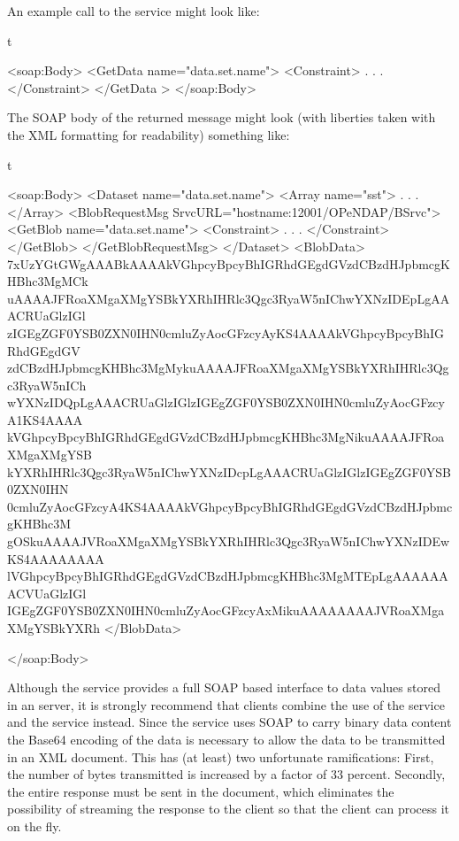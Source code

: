 \documentclass[justify]{dods-paper}
\begin{document}
An example call to the \GetData service might look like:

\begin{vcode}{t}

    <soap:Body>
        <GetData name="data.set.name">
            <Constraint>
                .
                .
                .
            </Constraint>
        </GetData >
    </soap:Body>
    
    
\end{vcode}

The SOAP body of the returned message might look (with liberties taken
with the XML formatting for readability) something like:

\begin{vcode}{t}

    <soap:Body>
        <Dataset name="data.set.name">
            <Array name="sst">
                .
                .
                .
            </Array>
            <BlobRequestMsg SrvcURL="hostname:12001/OPeNDAP/BSrvc">
                <GetBlob name="data.set.name">
                    <Constraint>
                       .
                       .
                       .
                    </Constraint>
                </GetBlob>
            </GetBlobRequestMsg>
        </Dataset>
        <BlobData>
        7xUzYGtGWgAAABkAAAAkVGhpcyBpcyBhIGRhdGEgdGVzdCBzdHJpbmcgKHBhc3MgMCk
        uAAAAJFRoaXMgaXMgYSBkYXRhIHRlc3Qgc3RyaW5nIChwYXNzIDEpLgAAACRUaGlzIGl
        zIGEgZGF0YSB0ZXN0IHN0cmluZyAocGFzcyAyKS4AAAAkVGhpcyBpcyBhIGRhdGEgdGV
        zdCBzdHJpbmcgKHBhc3MgMykuAAAAJFRoaXMgaXMgYSBkYXRhIHRlc3Qgc3RyaW5nICh
        wYXNzIDQpLgAAACRUaGlzIGlzIGEgZGF0YSB0ZXN0IHN0cmluZyAocGFzcyA1KS4AAAA
        kVGhpcyBpcyBhIGRhdGEgdGVzdCBzdHJpbmcgKHBhc3MgNikuAAAAJFRoaXMgaXMgYSB
        kYXRhIHRlc3Qgc3RyaW5nIChwYXNzIDcpLgAAACRUaGlzIGlzIGEgZGF0YSB0ZXN0IHN
        0cmluZyAocGFzcyA4KS4AAAAkVGhpcyBpcyBhIGRhdGEgdGVzdCBzdHJpbmcgKHBhc3M
        gOSkuAAAAJVRoaXMgaXMgYSBkYXRhIHRlc3Qgc3RyaW5nIChwYXNzIDEwKS4AAAAAAAA
        lVGhpcyBpcyBhIGRhdGEgdGVzdCBzdHJpbmcgKHBhc3MgMTEpLgAAAAAAACVUaGlzIGl
        IGEgZGF0YSB0ZXN0IHN0cmluZyAocGFzcyAxMikuAAAAAAAAJVRoaXMgaXMgYSBkYXRh
        </BlobData>
          
    </soap:Body>
    
\end{vcode}

Although the \GetData service provides a full SOAP based interface to
data values stored in an \opendap server, it is strongly recommend
that clients combine the use of the \GetDDX service and the \GetBlob
service instead. Since the \GetData service uses SOAP to carry binary
data content the Base64 encoding of the data is necessary to allow the
data to be transmitted in an XML document. This has (at least) two
unfortunate ramifications: First, the number of bytes transmitted is
increased by a factor of 33 percent. Secondly, the entire response
must be sent in the document, which eliminates the possibility of
streaming the response to the client so that the client can process it
on the fly.
\end{document}
